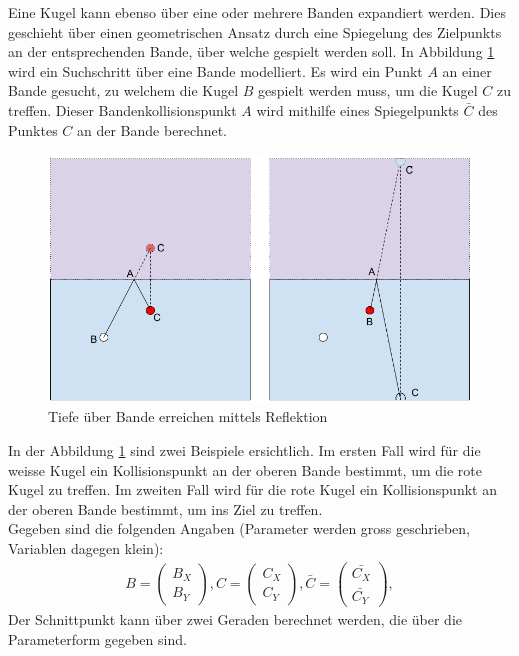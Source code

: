 Eine Kugel kann ebenso über eine oder mehrere Banden expandiert werden. Dies geschieht über einen
geometrischen Ansatz durch eine Spiegelung\cite{math.stackexchange:1}
des Zielpunkts an der entsprechenden Bande, über welche gespielt werden soll. In Abbildung \ref{fig:Tiefe über Bande erreichen mittels Reflektion}
wird ein Suchschritt über eine Bande modelliert. Es wird ein Punkt $A$ an einer Bande gesucht, zu welchem die Kugel $B$
gespielt werden muss, um die Kugel $C$ zu treffen. Dieser Bandenkollisionspunkt $A$ wird mithilfe eines Spiegelpunkts $\bar{C}$
des Punktes $C$ an der Bande berechnet.
\begin{figure}[h!]
    \begin{center}
        \includegraphics[width=0.5\linewidth]{../common/03_billiard_ai/resources/47_rail_reflection_1.png}
    \end{center}
    \caption{Tiefe über Bande erreichen mittels Reflektion}
    \label{fig:Tiefe über Bande erreichen mittels Reflektion}
\end{figure}
In der Abbildung \ref{fig:Tiefe über Bande erreichen mittels Reflektion} sind zwei Beispiele ersichtlich.
Im ersten Fall wird für die weisse Kugel ein Kollisionspunkt an der oberen Bande bestimmt, um die rote Kugel zu treffen.
Im zweiten Fall wird für die rote Kugel ein Kollisionspunkt an der oberen Bande bestimmt, um ins Ziel zu treffen.\\
Gegeben sind die folgenden Angaben (Parameter werden gross geschrieben, Variablen dagegen klein):
\begin{align}
    B = \begin{pmatrix}B_X\\B_Y\end{pmatrix},
    C = \begin{pmatrix}C_X\\C_Y\end{pmatrix},
    \bar{C} = \begin{pmatrix}\bar{C_X}\\\bar{C_Y}\end{pmatrix},
\end{align}
Der Schnittpunkt kann über zwei Geraden berechnet werden, die über die Parameterform gegeben sind.

